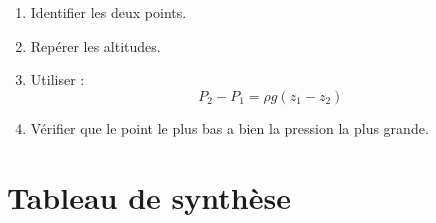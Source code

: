 \documentclass[11pt,a4paper]{article}
\begin{document}
\begin{methodebox}
\begin{enumerate}
    \item Identifier les deux points.
    \item Repérer les altitudes.
    \item Utiliser :
    \[
    P_2-P_1=\rho g(z_1-z_2)
    \]
    \item Vérifier que le point le plus bas a bien la pression la plus grande.
\end{enumerate}
\end{methodebox}

\section{Tableau de synthèse}
\end{document}
